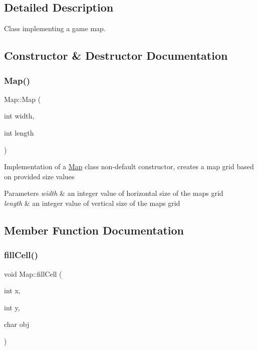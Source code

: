 \subsection{Detailed Description}
Class implementing a game map. 

\subsection{Constructor \& Destructor Documentation}
\hypertarget{classMap_a1d58d9a6724d335f6173cdd4065af24a}{}\label{classMap_a1d58d9a6724d335f6173cdd4065af24a} 
\subsubsection{\texorpdfstring{Map()}{Map()}}
{\footnotesize\ttfamily Map\+::\+Map (\begin{DoxyParamCaption}\item[{int}]{width,  }\item[{int}]{length }\end{DoxyParamCaption})}

Implementation of a \hyperlink{classMap}{Map} class non-\/default constructor, creates a map grid based on provided size values 
\begin{DoxyParams}{Parameters}
{\em width} & an integer value of horizontal size of the map\textquotesingle{}s grid \\
\hline
{\em length} & an integer value of vertical size of the map\textquotesingle{}s grid \\
\hline
\end{DoxyParams}


\subsection{Member Function Documentation}
\hypertarget{classMap_a96c5c1d56e2b58c2ea81f49106e20b3c}{}\label{classMap_a96c5c1d56e2b58c2ea81f49106e20b3c} 
\subsubsection{\texorpdfstring{fill\+Cell()}{fillCell()}}
{\footnotesize\ttfamily void Map\+::fill\+Cell (\begin{DoxyParamCaption}\item[{int}]{x,  }\item[{int}]{y,  }\item[{char}]{obj }\end{DoxyParamCaption})}

